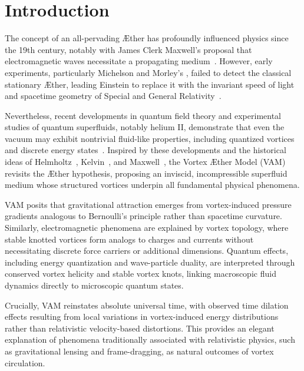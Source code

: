 \documentclass[a4paper,12pt]{article}
\begin{document}
\newpage
    \tableofcontents





\section*{Introduction}

The concept of an all-pervading Æther has profoundly influenced physics since the 19th century, notably with James Clerk Maxwell's proposal that electromagnetic waves necessitate a propagating medium~\cite{Maxwell1865}. However, early experiments, particularly Michelson and Morley's \cite{michelson1887}, failed to detect the classical stationary Æther, leading Einstein to replace it with the invariant speed of light and spacetime geometry of Special and General Relativity~\cite{einstein1916foundation}.

Nevertheless, recent developments in quantum field theory and experimental studies of quantum superfluids, notably helium II, demonstrate that even the vacuum may exhibit nontrivial fluid-like properties, including quantized vortices and discrete energy states~\cite{Wilczek1999, Donnelly1991quantized}. Inspired by these developments and the historical ideas of Helmholtz~\cite{helmholtz1867integrals}, Kelvin~\cite{kelvin1867vortex}, and Maxwell~\cite{Maxwell1865}, the Vortex Æther Model (VAM) revisits the Æther hypothesis, proposing an inviscid, incompressible superfluid medium whose structured vortices underpin all fundamental physical phenomena.

VAM posits that gravitational attraction emerges from vortex-induced pressure gradients analogous to Bernoulli's principle rather than spacetime curvature. Similarly, electromagnetic phenomena are explained by vortex topology, where stable knotted vortices form analogs to charges and currents without necessitating discrete force carriers or additional dimensions. Quantum effects, including energy quantization and wave-particle duality, are interpreted through conserved vortex helicity and stable vortex knots, linking macroscopic fluid dynamics directly to microscopic quantum states.

Crucially, VAM reinstates absolute universal time, with observed time dilation effects resulting from local variations in vortex-induced energy distributions rather than relativistic velocity-based distortions. This provides an elegant explanation of phenomena traditionally associated with relativistic physics, such as gravitational lensing and frame-dragging, as natural outcomes of vortex circulation.
\end{document}
